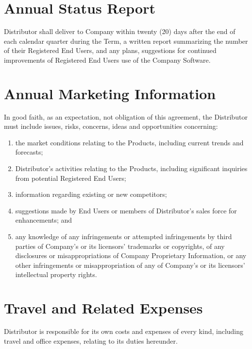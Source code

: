 \documentclass[letterpaper,10pt,english]{sphinxmanual}
\begin{document}
\section{Annual Status Report}
\label{\detokenize{additionalresponsibilities2:annual-status-report}}
Distributor shall deliver to Company within twenty (20) days after the end of each calendar quarter during the Term, a written report summarizing the number of their Registered End Users, and any plans, suggestions for continued improvements of Registered End Users use of the Company Software.


\section{Annual Marketing Information}
\label{\detokenize{additionalresponsibilities2:annual-marketing-information}}
In good faith, as an expectation, not obligation of this agreement, the Distributor must include issues, risks, concerns, ideas and opportunities concerning:
\begin{enumerate}
\item {} 
the market conditions relating to the Products, including current trends and forecasts;

\item {} 
Distributor’s activities relating to the Products, including significant inquiries from potential Registered End Users;

\item {} 
information regarding existing or new competitors;

\item {} 
suggestions made by End Users or members of Distributor’s sales force for enhancements; and

\item {} 
any knowledge of any infringements or attempted infringements by third parties of Company’s or its licensors’ trademarks or copyrights, of any disclosures or misappropriations of Company Proprietary Information, or any other infringements or misappropriation of any of Company’s or its licensors’ intellectual property rights.

\end{enumerate}


\section{Travel and Related Expenses}
\label{\detokenize{additionalresponsibilities2:travel-and-related-expenses}}
Distributor is responsible for its own costs and expenses of every kind, including travel and office expenses, relating to its duties hereunder.
\end{document}
